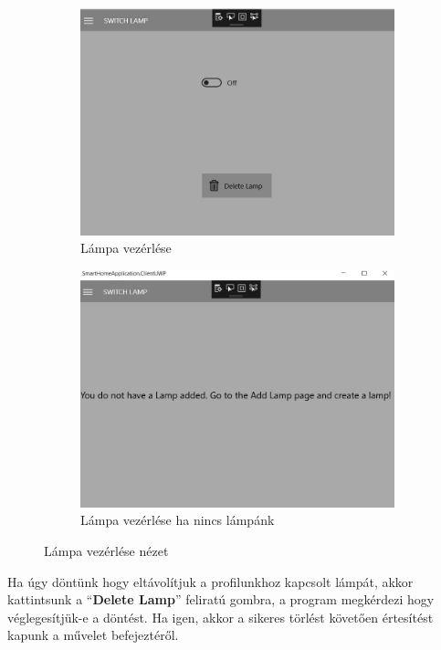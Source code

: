 \documentclass[a4paper,12pt]{report}
\begin{document}
\begin{figure}[H]
    \centering
    \begin{subfigure}[b]{0.4\linewidth}
        \includegraphics[width=\linewidth]{images/switchview.jpg}
        \caption{Lámpa vezérlése}
    \end{subfigure}
    \begin{subfigure}[b]{0.4\linewidth}
        \includegraphics[width=\linewidth]{images/switchdonthavelamp.jpg}
        \caption{Lámpa vezérlése ha nincs lámpánk}
    \end{subfigure}
    \caption{Lámpa vezérlése nézet}
    \label{fig:SwitchLampView}
\end{figure}

    Ha úgy döntünk hogy eltávolítjuk a profilunkhoz kapcsolt lámpát, akkor kattintsunk a ``\textbf{Delete Lamp}'' feliratú
    gombra, a program megkérdezi hogy véglegesítjük-e a döntést. Ha igen, akkor a sikeres törlést követően értesítést kapunk
    a művelet befejeztéről.
\end{document}
